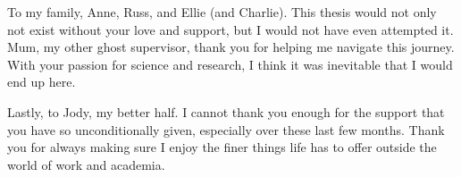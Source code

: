 To my family, Anne, Russ, and Ellie (and Charlie). This thesis would not only not exist without your love and support, but I would not have even attempted it. Mum, my other ghost supervisor, thank you for helping me navigate this journey. With your passion for science and research, I think it was inevitable that I would end up here.

Lastly, to Jody, my better half. I cannot thank you enough for the support that you have so unconditionally given, especially over these last few months. Thank you for always making sure I enjoy the finer things life has to offer outside the world of work and academia.